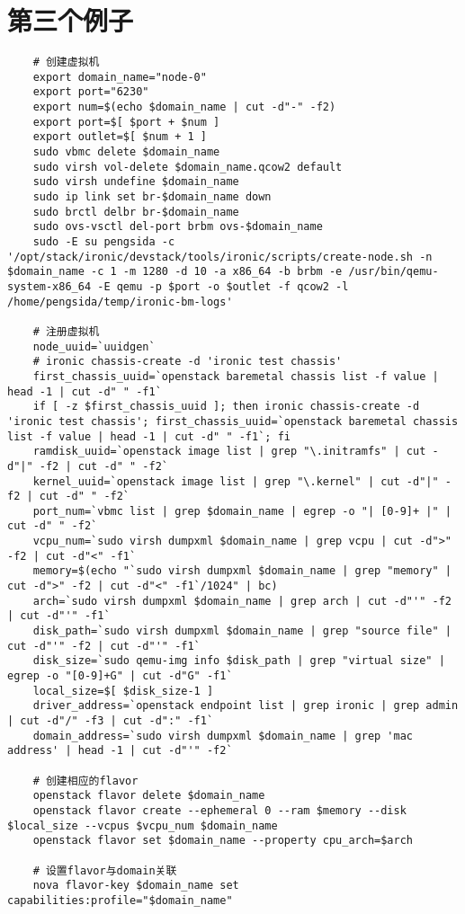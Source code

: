 \documentclass[a4paper,left=2.5cm,right=2.5cm,11pt]{article}
\begin{document}
\section{第三个例子}
	\begin{lstlisting}
	# 创建虚拟机
	export domain_name="node-0"
	export port="6230"
	export num=$(echo $domain_name | cut -d"-" -f2)
	export port=$[ $port + $num ]
	export outlet=$[ $num + 1 ]
	sudo vbmc delete $domain_name
	sudo virsh vol-delete $domain_name.qcow2 default
	sudo virsh undefine $domain_name
	sudo ip link set br-$domain_name down
	sudo brctl delbr br-$domain_name
	sudo ovs-vsctl del-port brbm ovs-$domain_name
	sudo -E su pengsida -c '/opt/stack/ironic/devstack/tools/ironic/scripts/create-node.sh -n $domain_name -c 1 -m 1280 -d 10 -a x86_64 -b brbm -e /usr/bin/qemu-system-x86_64 -E qemu -p $port -o $outlet -f qcow2 -l /home/pengsida/temp/ironic-bm-logs'

	# 注册虚拟机
	node_uuid=`uuidgen`
	# ironic chassis-create -d 'ironic test chassis'
	first_chassis_uuid=`openstack baremetal chassis list -f value | head -1 | cut -d" " -f1`
	if [ -z $first_chassis_uuid ]; then ironic chassis-create -d 'ironic test chassis'; first_chassis_uuid=`openstack baremetal chassis list -f value | head -1 | cut -d" " -f1`; fi
	ramdisk_uuid=`openstack image list | grep "\.initramfs" | cut -d"|" -f2 | cut -d" " -f2`
	kernel_uuid=`openstack image list | grep "\.kernel" | cut -d"|" -f2 | cut -d" " -f2`
	port_num=`vbmc list | grep $domain_name | egrep -o "| [0-9]+ |" | cut -d" " -f2`
	vcpu_num=`sudo virsh dumpxml $domain_name | grep vcpu | cut -d">" -f2 | cut -d"<" -f1`
	memory=$(echo "`sudo virsh dumpxml $domain_name | grep "memory" | cut -d">" -f2 | cut -d"<" -f1`/1024" | bc)
	arch=`sudo virsh dumpxml $domain_name | grep arch | cut -d"'" -f2 | cut -d"'" -f1`
	disk_path=`sudo virsh dumpxml $domain_name | grep "source file" | cut -d"'" -f2 | cut -d"'" -f1`
	disk_size=`sudo qemu-img info $disk_path | grep "virtual size" | egrep -o "[0-9]+G" | cut -d"G" -f1`
	local_size=$[ $disk_size-1 ]
	driver_address=`openstack endpoint list | grep ironic | grep admin | cut -d"/" -f3 | cut -d":" -f1`
	domain_address=`sudo virsh dumpxml $domain_name | grep 'mac address' | head -1 | cut -d"'" -f2`

	# 创建相应的flavor
	openstack flavor delete $domain_name
	openstack flavor create --ephemeral 0 --ram $memory --disk $local_size --vcpus $vcpu_num $domain_name
	openstack flavor set $domain_name --property cpu_arch=$arch

	# 设置flavor与domain关联
	nova flavor-key $domain_name set capabilities:profile="$domain_name"


\end{lstlisting}
\end{document}

